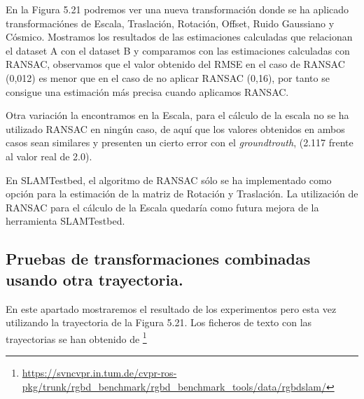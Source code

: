 En la Figura 5.21 podremos ver una nueva transformación donde se ha aplicado transformaciónes de Escala, Traslación, Rotación, Offset, Ruido Gaussiano y Cósmico. Mostramos los resultados de las estimaciones calculadas que relacionan el dataset A con el dataset B y comparamos con las estimaciones calculadas con RANSAC, observamos que el valor obtenido del RMSE en el caso de RANSAC (0,012) es menor que en el caso de no aplicar RANSAC (0,16), por tanto se consigue una estimación más precisa cuando aplicamos RANSAC.

Otra variación la encontramos en la Escala, para el cálculo de la escala no se ha utilizado RANSAC en ningún caso, de aquí que los valores obtenidos en ambos casos sean similares y presenten un cierto error con el \textit{groundtrouth}, (2.117 frente al valor real de 2.0). 

En SLAMTestbed, el algoritmo de RANSAC sólo se ha implementado como opción para la estimación de la matriz de Rotación y Traslación.
La utilización de RANSAC para el cálculo de la Escala quedaría como futura mejora de la herramienta SLAMTestbed.


\newpage

\subsection {Pruebas de transformaciones combinadas usando otra trayectoria.}

En este apartado mostraremos el resultado de los experimentos pero esta vez utilizando la trayectoria de la Figura 5.21. Los ficheros de texto con las trayectorias se han obtenido de \footnote{\url{https://svncvpr.in.tum.de/cvpr-ros-pkg/trunk/rgbd_benchmark/rgbd_benchmark_tools/data/rgbdslam/}}

